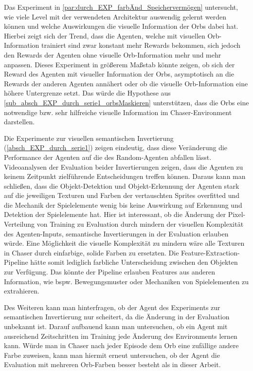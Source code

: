 Das Experiment in \ref{par:durch_EXP_farbÄnd_Speichervermögen} untersucht, wie viele Level mit der verwendeten Architektur auswendig gelernt werden können und welche Auswirkungen die visuelle Information der Orbs dabei hat. Hierbei zeigt sich der Trend, dass die Agenten, welche mit visuellen Orb-Information trainiert sind zwar konstant mehr Rewards bekommen, sich jedoch den Rewards der Agenten ohne visuelle Orb-Information mehr und mehr anpassen. Dieses Experiment in größerem Maßstab könnte zeigen, ob sich der Reward des Agenten mit visueller Information der Orbs, asymptotisch an die Rewards der anderen Agenten annähert oder ob die visuelle Orb-Information eine höhere Untergrenze setzt. Das würde die Hypothese aus \ref{sub_absch_EXP_durch_serie1_orbsMaskieren} unterstützen, dass die Orbs eine notwendige bzw. sehr hilfreiche visuelle Information im Chaser-Environment darstellen. 

Die Experimente zur visuellen semantischen Invertierung (\ref{absch_EXP_durch_serie1}) zeigen eindeutig, dass diese Veränderung die Performance der Agenten auf die des Random-Agenten abfallen lässt. Videoanalysen der Evaluation beider Invertierungen zeigen, dass die Agenten zu keinem Zeitpunkt zielführende Entscheidungen treffen können. Daraus kann man schließen, dass die Objekt-Detektion und Objekt-Erkennung der Agenten stark auf die jeweiligen Texturen und Farben der vertauschten Sprites overfitted und die Mechanik der Spielelemente wenig bis keine Auswirkung auf Erkennung und Detektion der Spielelemente hat. Hier ist interessant, ob die Änderung der Pixel-Verteilung von Training zu Evaluation durch mindern der visuellen Komplexität des Agenten-Inputs, semantische Invertierungen in der Evaluation erlauben würde. Eine Möglichkeit die visuelle Komplexität zu mindern wäre alle Texturen in Chaser durch einfarbige, solide Farben zu ersetzten. Die Feature-Extraction-Pipeline hätte somit lediglich farbliche Unterscheidung zwischen den Objekten zur Verfügung. Das könnte der Pipeline erlauben Features aus anderen Information, wie bspw. Bewegungsmuster oder Mechaniken von Spielelementen zu extrahieren.

Des Weiteren kann man hinterfragen, ob der Agent des Experiments zur semantischen Invertierung nur scheitert, da die Änderung in der Evaluation unbekannt ist. Darauf aufbauend kann man untersuchen, ob ein Agent mit ausreichend Zeitschritten im Training jede Änderung des Environments lernen kann. Würde man in Chaser nach jeder Episode dem Orb eine zufällige andere Farbe zuweisen, kann man hiermit erneut untersuchen, ob der Agent die Evaluation mit mehreren Orb-Farben besser besteht als in dieser Arbeit. 


\newpage